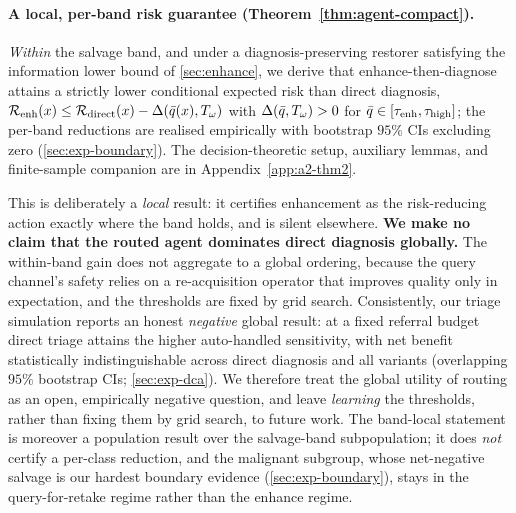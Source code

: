 \paragraph{A local, per-band risk guarantee (Theorem~\ref{thm:agent-compact}).}\label{sec:agent-thm2}
\emph{Within} the salvage band, and under a diagnosis-preserving restorer satisfying the information
lower bound of \cref{sec:enhance}, we derive that enhance-then-diagnose attains a strictly lower
conditional expected risk than direct diagnosis,
$\mathcal{R}_{\mathrm{enh}}(x)\le\mathcal{R}_{\mathrm{direct}}(x)-\Delta(\bar{q}(x),T_\omega)$ with $\Delta(\bar{q},T_\omega)>0$ for
$\bar{q}\in[\tau_{\mathrm{enh}},\tau_{\mathrm{high}}]$; the per-band reductions are realised empirically with bootstrap $95\%$
CIs excluding zero (\cref{sec:exp-boundary}). The decision-theoretic setup, auxiliary lemmas, and
finite-sample companion are in Appendix~\ref{app:a2-thm2}.



This is deliberately a \emph{local} result: it certifies enhancement as the risk-reducing action
exactly where the band holds, and is silent elsewhere. \textbf{We make no claim that the routed agent
dominates direct diagnosis globally.} The within-band gain does not aggregate to a global ordering,
because the query channel's safety relies on a re-acquisition operator that improves quality only in
expectation, and the thresholds are fixed by grid search. Consistently, our triage simulation reports
an honest \emph{negative} global result: at a fixed referral budget direct triage attains the higher
auto-handled sensitivity, with net benefit statistically indistinguishable across direct diagnosis
and all variants (overlapping $95\%$ bootstrap CIs; \cref{sec:exp-dca}). We therefore treat the global utility of routing as an open, empirically
negative question, and leave \emph{learning} the thresholds, rather than fixing them by grid search,
to future work. The band-local statement is moreover a population result over the salvage-band
subpopulation; it does \emph{not} certify a per-class reduction, and the malignant subgroup, whose
net-negative salvage is our hardest boundary evidence (\cref{sec:exp-boundary}), stays in the
query-for-retake regime rather than the enhance regime.
